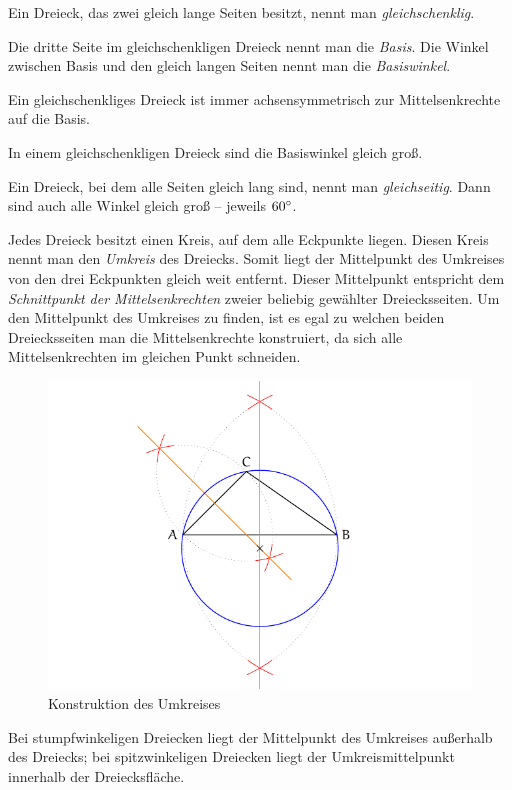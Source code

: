 \begin{defi}
 Ein Dreieck, das zwei gleich lange Seiten besitzt, nennt man \emph{gleichschenklig}.
 
 Die dritte Seite im gleichschenkligen Dreieck nennt man die \emph{Basis}. Die Winkel zwischen Basis und den gleich langen Seiten nennt man die \emph{Basiswinkel}.
 
 Ein gleichschenkliges Dreieck ist immer achsensymmetrisch zur Mittelsenkrechte auf die Basis.
 
 In einem gleichschenkligen Dreieck sind die Basiswinkel gleich groß.
\end{defi}

\begin{defi}
 Ein Dreieck, bei dem alle Seiten gleich lang sind, nennt man \emph{gleichseitig}. Dann sind auch alle Winkel gleich groß -- jeweils \(60\degree\).
\end{defi}

\begin{regel}[Umkreis]
 Jedes Dreieck besitzt einen Kreis, auf dem alle Eckpunkte liegen. Diesen Kreis nennt man den \emph{Umkreis} des Dreiecks.
 Somit liegt der Mittelpunkt des Umkreises von den drei Eckpunkten gleich weit entfernt. Dieser Mittelpunkt entspricht dem \emph{Schnittpunkt der Mittelsenkrechten} zweier beliebig gewählter Dreiecksseiten. Um den Mittelpunkt des Umkreises zu finden, ist es egal zu welchen beiden Dreiecksseiten man die Mittelsenkrechte konstruiert, da sich alle Mittelsenkrechten im gleichen Punkt schneiden.
 
 \begin{figure}[ht]
 \centering
 \includegraphics[width=.8\textwidth]{./umkreis.pdf}
 \caption{Konstruktion des Umkreises}
 \label{fig:umkreis}
\end{figure}
 
 Bei stumpfwinkeligen Dreiecken liegt der Mittelpunkt des Umkreises außerhalb des Dreiecks; bei spitzwinkeligen Dreiecken liegt der Umkreismittelpunkt innerhalb der Dreiecksfläche.
\end{regel}


